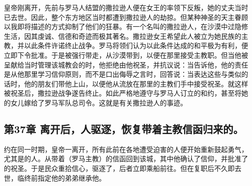 皇帝刚离开，先前与罗马人结盟的撒拉逊人便在女王的率领下反叛，她的丈夫当时已去世。因此，整个东方地区当时都遭到撒拉逊人的劫掠。但某种神圣的天主眷顾以我即将描述的方式抑制了他们的狂暴。有一个名叫的撒拉逊人，在沙漠中过隐修生活，因其虔诚、信德和奇迹而极其著名。撒拉逊女王希望此人被立为她民族的主教，并以此条件许诺终止战争。罗马将领们认为以此条件达成的和平极为有利，便立即下令批准。于是被强行带走，从沙漠带到，以便在那里接受主教职。但当他被呈献给当时管理该城教会的时，他拒绝由他祝圣，并抗议说：当告诉他，他的责任是从他那里学习信仰原则，而不是口出侮辱之言时，回答说：当表达这些与类似的话时，他的朋友们带他上山，以便他从流放在那里的主教们手中接受祝圣。就这样被祝圣后，撒拉逊战争遂告终止。如此严格地遵守与罗马人订立的和约，甚至将她的女儿嫁给了罗马军队总司令。这就是有关撒拉逊人的事迹。\par


\subsection{第37章 离开后，人驱逐，恢复带着主教信函归来的。}

约在同一时期，皇帝一离开，所有此前在各地遭受迫害的人便开始重新鼓起勇气，尤其是的人。从带着（罗马主教）的信函回到该城，其中他确认了信仰，并批准了的祝圣。于是民众重拾信心，驱逐了，后者立即乘船前往。但在复职后不久即去世，临终前指定他的弟弟继承他。\par


